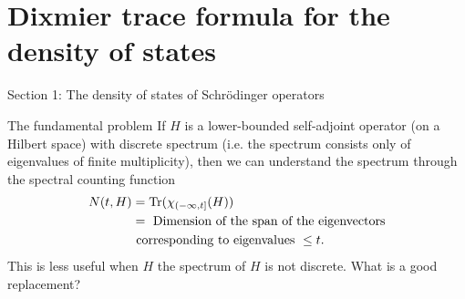 \documentclass{beamer}
\numberwithin{equation}{section}
\theoremstyle{plain}
\theoremstyle{plain}
\theoremstyle{definition}
\theoremstyle{plain}
\theoremstyle{plain}
\theoremstyle{definition}
\newcommand{\tr}{{\rm Tr}}
\newcommand{\Vol}{\mathrm{Vol}}
\newcommand{\Rl}{\mathbb{R}}
\begin{document}
\section{Dixmier trace formula for the density of states}

\begin{frame}
    \huge{Section 1: The density of states of Schr\"odinger operators}
\end{frame}
% 
\begin{frame}{The fundamental problem}
    If $H$ is a lower-bounded self-adjoint operator (on a Hilbert space) with discrete spectrum (i.e. the spectrum consists only of eigenvalues of finite multiplicity), then we can understand the spectrum through the spectral counting function
    \begin{align*}
        N(t,H) &= \tr(\chi_{(-\infty,t]}(H))\\
                     &= \text{ Dimension of the span of the eigenvectors}\\
                     &\text{ corresponding to eigenvalues }\leq t.
    \end{align*}
    \pause
    This is less useful when $H$ the spectrum of $H$ is not discrete. What is a good replacement?\pause


\end{frame} 
% 
\end{document}
